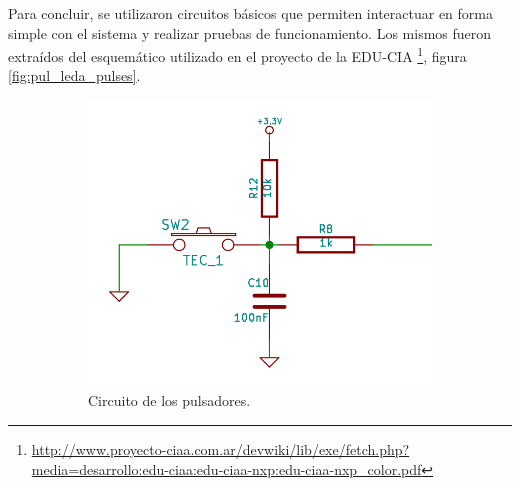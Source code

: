 Para concluir, se utilizaron circuitos básicos que permiten interactuar en forma simple con el sistema y realizar pruebas de funcionamiento.
Los mismos fueron extraídos del esquemático utilizado en el proyecto de la EDU-CIA \footnote{\url{http://www.proyecto-ciaa.com.ar/devwiki/lib/exe/fetch.php?media=desarrollo:edu-ciaa:edu-ciaa-nxp:edu-ciaa-nxp\_color.pdf}}, figura \ref{fig:pul_leda_pulses}.


\begin{figure}[!hp]
  \begin{subfigure}{0.4\textwidth}
    \centering
    \includegraphics[width=1\linewidth]{./Figures/pulse_sch.png}
    \caption{Circuito de los pulsadores.}
  \end{subfigure}%
  \hfill
  \begin{subfigure}{0.4\textwidth}
    \centering

\end{subfigure}
\end{figure}
